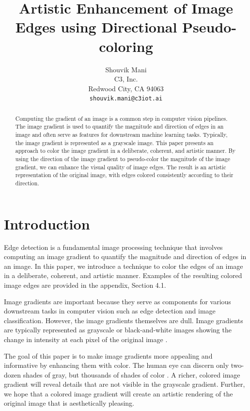 \documentclass{article}
\title{Artistic Enhancement of Image Edges using Directional Pseudo-coloring}
\author{
  Shouvik Mani \\
  C3, Inc.\\
  Redwood City, CA 94063 \\
  \texttt{shouvik.mani@c3iot.ai} \\
}
\begin{document}

\maketitle

\begin{abstract}
Computing the gradient of an image is a common step in computer vision pipelines. The image gradient is used to quantify the magnitude and direction of edges in an image and often serve as features for downstream machine learning tasks. Typically, the image gradient is represented as a grayscale image. This paper presents an approach to color the image gradient in a deliberate, coherent, and artistic manner. By using the direction of the image gradient to pseudo-color the magnitude of the image gradient, we can enhance the visual quality of image edges. The result is an artistic representation of the original image, with edges colored consistently according to their direction.
\end{abstract}

\section{Introduction}

Edge detection is a fundamental image processing technique that involves computing an image gradient to quantify the magnitude and direction of edges in an image. In this paper, we introduce a technique to color the edges of an image in a deliberate, coherent, and artistic manner. Examples of the resulting colored image edges are provided in the appendix, Section 4.1.

Image gradients are important because they serve as components for various downstream tasks in computer vision such as edge detection and image classification. However, the image gradients themselves are dull. Image gradients are typically represented as grayscale or black-and-white images showing the change in intensity at each pixel of the original image \cite{cv_book}.

The goal of this paper is to make image gradients more appealing and informative by enhancing them with color. The human eye can discern only two-dozen shades of gray, but thousands of shades of color \cite{human_machine}. A richer, colored image gradient will reveal details that are not visible in the grayscale gradient. Further, we hope that a colored image gradient will create an artistic rendering of the original image that is aesthetically pleasing.
\end{document}
